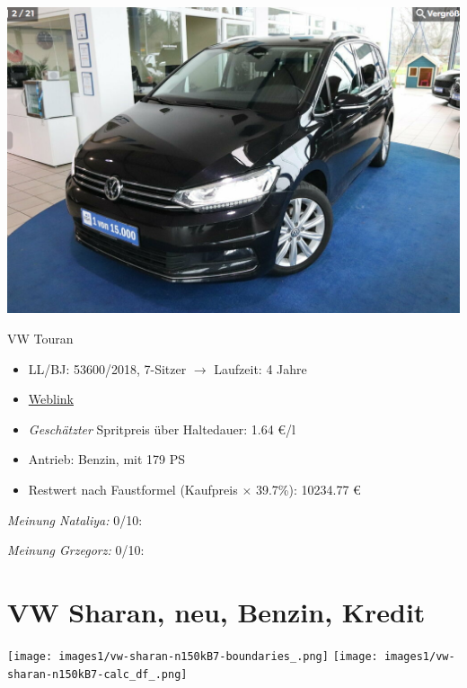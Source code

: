 \documentclass[landscape, DIV=99, 14pt]{scrartcl}
\begin{document}
\pagebreak
\begin{center}
\includegraphics[width=0.9\columnwidth]{cars/vw-touran-geb2.png}

VW Touran
\end{center}

\begin{itemize}
    \item LL/BJ: 53600/2018, 7-Sitzer $\rightarrow$ Laufzeit: 4 Jahre
    \item \href{https://suchen.mobile.de/fahrzeuge/details.html?id=337573342}{Weblink}
    \item \emph{Gesch\"atzter} Spritpreis \"uber Haltedauer: 1.64 \euro{}/l
    \item Antrieb: Benzin, mit 179 PS
    \item Restwert nach Faustformel (Kaufpreis $\times$ 39.7\%): 10234.77 \euro{}
\end{itemize}

\begin{small}
\emph{Meinung Nataliya:} 0/10: 
        
\emph{Meinung Grzegorz:} 0/10: 
\end{small}

\pagebreak


\twocolumn

\section*{VW Sharan, neu, Benzin, Kredit}
\begin{center}
\texttt{[image: images1/vw-sharan-n150kB7-boundaries\_.png]}
\null
\vspace{0.5cm}
\texttt{[image: images1/vw-sharan-n150kB7-calc\_df\_.png]}
\end{center}
\end{document}
